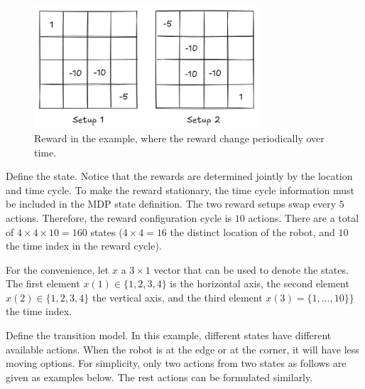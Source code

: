 \begin{figure}[!htb]
	\centering
	\includegraphics[width=0.75\textwidth]{./chapters/part-1/figures/valueiterationexp.png}
	\caption{Reward in the example, where the reward change periodically over time.}
	\label{fig:valueiterationexp}
\end{figure}

Define the state. Notice that the rewards are determined jointly by the location and time cycle. To make the reward stationary, the time cycle information must be included in the MDP state definition. The two reward setups swap every $5$ actions. Therefore, the reward configuration cycle is $10$ actions. There are a total of $4\times 4\times 10=160$ states ($4\times 4=16$ the distinct location of the robot, and $10$ the time index in the reward cycle).

For the convenience, let $x$ a $3\times 1$ vector that can be used to denote the states. The first element $x(1)\in \{1,2,3,4\}$ is the horizontal axis, the second element $x(2)\in \{1,2,3,4\}$ the vertical axis, and the third element $x(3) = \{1,\ldots,10\}\}$ the time index.

Define the transition model. In this example, different states have different available actions. When the robot is at the edge or at the corner, it will have less moving options. For simplicity, only two actions from two states as follows are given as examples below. The rest actions can be formulated similarly.

